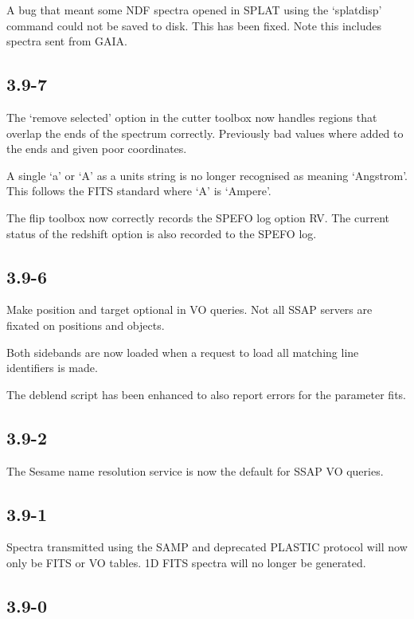 \documentclass[twoside,11pt]{article}
\renewcommand{\_}{\texttt{\symbol{95}}}
\begin{document}
A bug that meant some NDF spectra opened in SPLAT using the `splatdisp'
command could not be saved to disk. This has been fixed. Note this includes
spectra sent from GAIA.

\subsection{3.9-7}

The `remove selected' option in the cutter toolbox now handles regions that
overlap the ends of the spectrum correctly. Previously bad values where added
to the ends and given poor coordinates.

A single `a' or `A' as a units string is no longer recognised as meaning
`Angstrom'. This follows the FITS standard where `A' is `Ampere'.

The flip toolbox now correctly records the SPEFO log option RV.  The current
status of the redshift option is also recorded to the SPEFO log.

\subsection{3.9-6}

Make position and target optional in VO queries. Not all SSAP servers are
fixated on positions and objects.

Both sidebands are now loaded when a request to load all matching line
identifiers is made.

The deblend script has been enhanced to also report errors for the parameter
fits.

\subsection{3.9-2}

The Sesame name resolution service is now the default for SSAP VO queries.

\subsection{3.9-1}

Spectra transmitted using the SAMP and deprecated PLASTIC protocol will now
only be FITS or VO tables. 1D FITS spectra will no longer be generated.

\subsection{3.9-0}
\end{document}
